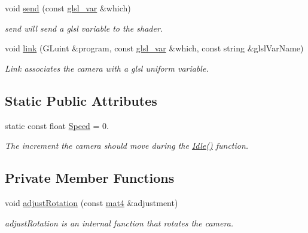 \begin{DoxyCompactItemize}
void \hyperlink{class_camera_a36cba68c08136242bf5d906f9c0b610c}{send} (const \hyperlink{class_camera_a6ff726a75a430e4f17e5dec42e4d4405}{glsl\-\_\-var} \&which)
\begin{DoxyCompactList}\small\item\em send will send a glsl variable to the shader. \end{DoxyCompactList}\item 
void \hyperlink{class_camera_ab7574214240c67ca774255ef1d7616de}{link} (G\-Luint \&program, const \hyperlink{class_camera_a6ff726a75a430e4f17e5dec42e4d4405}{glsl\-\_\-var} \&which, const string \&glsl\-Var\-Name)
\begin{DoxyCompactList}\small\item\em Link associates the camera with a glsl uniform variable. \end{DoxyCompactList}\end{DoxyCompactItemize}
\subsection*{Static Public Attributes}
\begin{DoxyCompactItemize}
\item 
static const float \hyperlink{class_camera_aedf8ba8b2af631a5a3e33b19bfa40322}{Speed} = 0.
\begin{DoxyCompactList}\small\item\em The increment the camera should move during the \hyperlink{class_camera_aec3559fe43597656629fdb00157d3c73}{Idle()} function. \end{DoxyCompactList}\end{DoxyCompactItemize}
\subsection*{Private Member Functions}
\begin{DoxyCompactItemize}
\item 
void \hyperlink{class_camera_a7ffc3619f9a5d8e586cb3d96ebdd3188}{adjust\-Rotation} (const \hyperlink{class_angel_1_1mat4}{mat4} \&adjustment)
\begin{DoxyCompactList}\small\item\em adjust\-Rotation is an internal function that rotates the camera. \end{DoxyCompactList}\end{DoxyCompactItemize}
